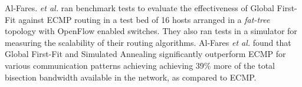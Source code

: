 Al-Fares. \textit{et al.} ran benchmark tests to evaluate the effectiveness of Global First-Fit against ECMP routing in a test bed of 16 hosts arranged in a \textit{fat-tree} topology with OpenFlow \cite{mckeown2008openflow} enabled switches. They also ran tests in a  simulator for measuring the scalability of their routing algorithms. Al-Fares \textit{et al.} \cite{al2010hedera} found that Global First-Fit and Simulated Annealing significantly outperform ECMP for various communication patterns achieving achieving 39\% more of the total bisection bandwidth available in the network, as compared to ECMP.
 